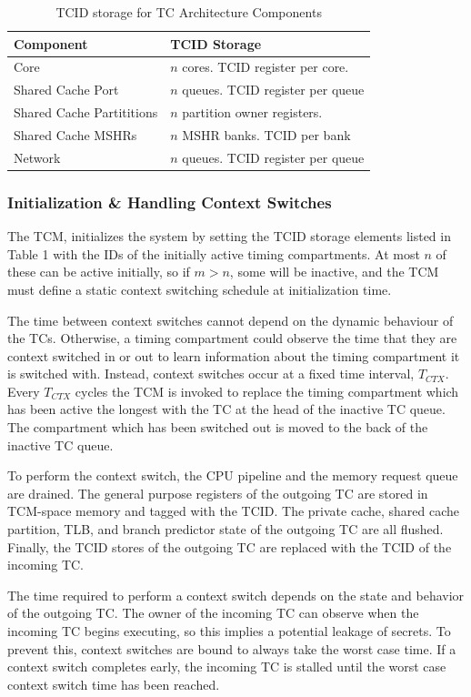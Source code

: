 \begin{table}
\begin{tabular}{l|l}
    \hline
    Component & TCID Storage \\
    \hline
    Core & $n$ cores. TCID register per core. \\
    Shared Cache Port & $n$ queues. TCID register per queue \\
    Shared Cache Partititions & $n$ partition owner registers. \\
    Shared Cache MSHRs & $n$ MSHR banks. TCID per bank \\
    Network & $n$ queues. TCID register per queue\\
    \hline
\end{tabular}
    \caption{TCID storage for TC Architecture Components}
    \label{table:tcid}
\end{table}

\subsubsection{Initialization \& Handling Context Switches}
The TCM, initializes the system by setting the TCID storage elements listed in 
Table 1 with the IDs of the initially active timing compartments. At most $n$ 
of these can be active initially, so if $m>n$, some will be inactive, and the 
TCM must define a static context switching schedule at initialization time.

The time between context switches cannot depend on the dynamic behaviour of the 
TCs. Otherwise, a timing compartment could observe the time that they are 
context switched in or out to learn information about the timing compartment it 
is switched with. Instead, context switches occur at a fixed time interval, 
$T_{CTX}$. Every $T_{CTX}$ cycles the TCM is invoked to replace the timing 
compartment which has been active the longest with the TC at the head of the 
inactive TC queue. The compartment which has been switched out is moved to the 
back of the inactive TC queue.

To perform the context switch, the CPU pipeline and the memory request queue 
are drained. The general purpose registers of the outgoing TC are stored in 
TCM-space memory and tagged with the TCID. The private cache, shared cache 
partition, TLB, and branch predictor state of the outgoing TC are all flushed.  
Finally, the TCID stores of the outgoing TC are replaced with the TCID of the 
incoming TC. 

The time required to perform a context switch depends on the state and behavior 
of the outgoing TC. The owner of the incoming TC can observe when the incoming 
TC begins executing, so this implies a potential leakage of secrets.  To 
prevent this, context switches are bound to always take the worst case time.  
If a context switch completes early, the incoming TC is stalled until the worst 
case context switch time has been reached.

